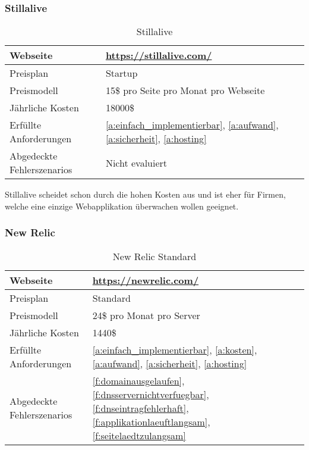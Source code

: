 \subsubsection{Stillalive}
\label{ssub:sillalive}

\begin{table}[H]
  \centering
  \begin{tabular}{p{5cm} p{7cm}}
  \toprule
    Webseite & \url{https://stillalive.com/}\\
  \hline
    Preisplan & Startup\\
  \hline
    Preismodell & 15\$ pro Seite pro Monat pro Webseite\\
  \hline
    Jährliche Kosten & 18000\$\\
  \hline
    Erfüllte Anforderungen & \ref{a:einfach_implementierbar}, \ref{a:aufwand}, \ref{a:sicherheit}, \ref{a:hosting}\\
  \hline
    Abgedeckte Fehlerszenarios & Nicht evaluiert\\
  \bottomrule
  \end{tabular}
  \caption{Stillalive}
  \label{tab:stillalive}
\end{table}

Stillalive scheidet schon durch die hohen Kosten aus und ist eher für Firmen, welche eine einzige Webapplikation überwachen wollen geeignet.

\subsubsection{New Relic}
\label{ssub:new_relic}

\begin{table}[H]
  \centering
  \begin{tabular}{p{5cm} p{7cm}}
  \toprule
    Webseite & \url{https://newrelic.com/}\\
  \hline
    Preisplan & Standard\\
  \hline
    Preismodell & 24\$ pro Monat pro Server\\
  \hline
    Jährliche Kosten & 1440\$\\
  \hline
    Erfüllte Anforderungen & \ref{a:einfach_implementierbar}, \ref{a:kosten}, \ref{a:aufwand}, \ref{a:sicherheit}, \ref{a:hosting}\\
  \hline
    Abgedeckte Fehlerszenarios & \ref{f:domainausgelaufen}, \ref{f:dnsservernichtverfuegbar}, \ref{f:dnseintragfehlerhaft}, \ref{f:applikationlaeuftlangsam}, \ref{f:seitelaedtzulangsam}\\
  \bottomrule
  \end{tabular}
  \caption{New Relic Standard}
  \label{tab:new_relic_standard}
\end{table}

